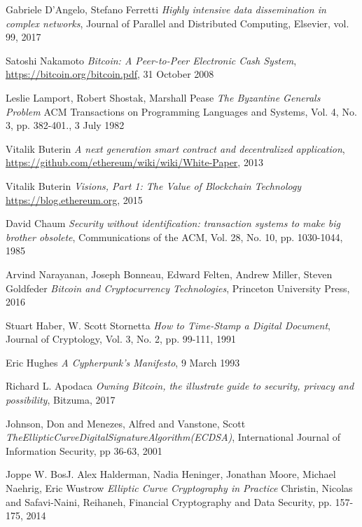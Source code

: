 \begin{thebibliography}{99}

 Gabriele D'Angelo, Stefano Ferretti
{\em Highly intensive data dissemination in complex networks},
Journal of Parallel and Distributed Computing, Elsevier, vol. 99, 2017

 Satoshi Nakamoto
{\em Bitcoin: A Peer-to-Peer Electronic Cash System},
\url{https://bitcoin.org/bitcoin.pdf}, 31 October 2008

 Leslie Lamport, Robert Shostak, Marshall Pease
{\em The Byzantine Generals Problem}
ACM Transactions on Programming Languages and Systems, Vol. 4, No. 3, pp. 382-401., 3 July 1982

 Vitalik Buterin
{\em A next generation smart contract and decentralized application},
\url{https://github.com/ethereum/wiki/wiki/White-Paper}, 2013

\bibitem Vitalik Buterin
{\em Visions, Part 1: The Value of Blockchain Technology}
\url{https://blog.ethereum.org}, 2015

 David Chaum
{\em Security without identification: transaction systems to make big brother obsolete},
Communications of the ACM, Vol. 28, No. 10, pp. 1030-1044, 1985

 Arvind Narayanan, Joseph Bonneau, Edward Felten, Andrew Miller, Steven Goldfeder
{\em Bitcoin and Cryptocurrency Technologies},
Princeton University Press, 2016

 Stuart Haber, W. Scott Stornetta
{\em How to Time-Stamp a Digital Document},
Journal of Cryptology, Vol. 3, No. 2, pp. 99-111, 1991

 Eric Hughes
{\em A Cypherpunk's Manifesto},
9 March 1993

 Richard L. Apodaca
{\em Owning Bitcoin, the illustrate guide to security, privacy and possibility},
Bitzuma, 2017

 Johnson, Don and Menezes, Alfred and Vanstone, Scott
{\em TheEllipticCurveDigitalSignatureAlgorithm(ECDSA)},
International Journal of Information Security, pp 36-63, 2001

 Joppe W. BosJ. Alex Halderman, Nadia Heninger, Jonathan Moore, Michael Naehrig, Eric Wustrow
{\em Elliptic Curve Cryptography in Practice}
Christin, Nicolas and Safavi-Naini, Reihaneh, Financial Cryptography and Data Security, pp. 157-175, 2014


\end{thebibliography}
